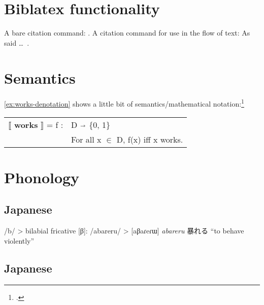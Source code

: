 \documentclass[a4paper,12pt,twoside]{article}
\begin{document}
\section{Biblatex functionality}
\label{sec:biblatex}

A bare citation command: \autocite{burgess-plunkett-2013-1}. A citation command
for use in the flow of text: As \textcite{burgess-plunkett-2013-1} said \dots~.

\section{Semantics}
\label{sec:semantics}

\autoref{ex:works-denotation} shows a little bit of semantics/mathematical
notation:\footcite[15]{heim-kratzer-1998}

\begin{exe}
    \ex\label{ex:works-denotation}

    \leavevmode\vadjust{\vspace{-\baselineskip}}

    \begin{tabular}[c]{l l}
      $\llbracket$ \textbf{works} $\rrbracket$ = f : & D $\shortrightarrow$ \{0, 1\} \\
                                                     & For all x $\in$ D, f(x) iff x works.  \\
    \end{tabular}

\end{exe}

\section{Phonology}\label{sec:phonology}
\subsection{Japanese}\label{ssec:phonology-japanese}

/b/ > bilabial fricative [β]: /abareru/ > [aβaɾeɾɯ] \textit{abareru} \textjapanese{暴れる} ``to behave violently''


\subsection{Japanese}\label{ssec:phonology-oldenglish}
\end{document}
